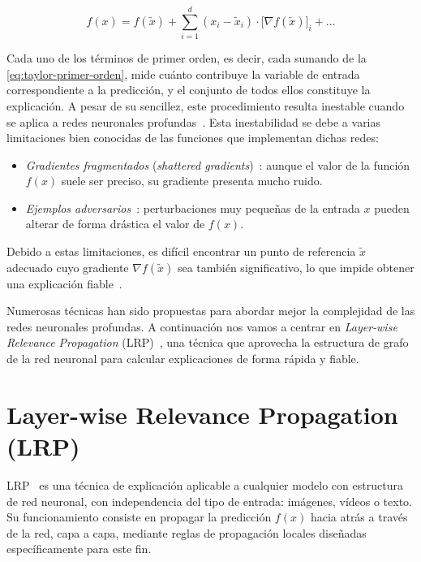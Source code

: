 \begin{equation}\label{eq:taylor-primer-orden}
  f(x) = f(\tilde{x}) + \sum_{i=1}^{d} (x_i - \tilde{x}_i) \cdot \bigl[\nabla f(\tilde{x})\bigr]_i + \dots
\end{equation}

Cada uno de los términos de primer orden, es decir, cada sumando de la
\cref{eq:taylor-primer-orden}, mide cuánto contribuye la variable de entrada
correspondiente a la predicción, y el conjunto de todos ellos constituye la
explicación. A pesar de su sencillez, este procedimiento resulta inestable cuando
se aplica a redes neuronales profundas~\cite{montavon2019lrp}. Esta inestabilidad
se debe a varias limitaciones bien conocidas de las funciones que implementan
dichas redes:

\begin{itemize}
  \item \emph{Gradientes fragmentados} (\emph{shattered gradients})~\cite{balduzzi2017}:
  aunque el valor de la función $f(x)$ suele ser preciso, su gradiente presenta
  mucho ruido.
  \item \emph{Ejemplos adversarios}~\cite{szegedy2014}: perturbaciones muy pequeñas
  de la entrada $x$ pueden alterar de forma drástica el valor de $f(x)$.
\end{itemize}

Debido a estas limitaciones, es difícil encontrar un punto de referencia
$\tilde{x}$ adecuado cuyo gradiente $\nabla f(\tilde{x})$ sea también
significativo, lo que impide obtener una explicación fiable~\cite{montavon2018}.

Numerosas técnicas han sido propuestas para abordar mejor la complejidad de las
redes neuronales profundas. A continuación nos vamos a centrar en \emph{Layer-wise
Relevance Propagation} (LRP)~\cite{bach2015}, una técnica que aprovecha la
estructura de grafo de la red neuronal para calcular explicaciones de forma rápida
y fiable.

\section{Layer-wise Relevance Propagation (LRP)}\label{sec:lrp}

LRP~\cite{bach2015,montavon2019lrp} es
una técnica de explicación aplicable a cualquier modelo con estructura de red
neuronal, con independencia del tipo de entrada: imágenes, vídeos o texto. Su funcionamiento consiste en
propagar la predicción $f(x)$ hacia atrás a través de la red, capa a capa,
mediante reglas de propagación locales diseñadas específicamente para este fin.

